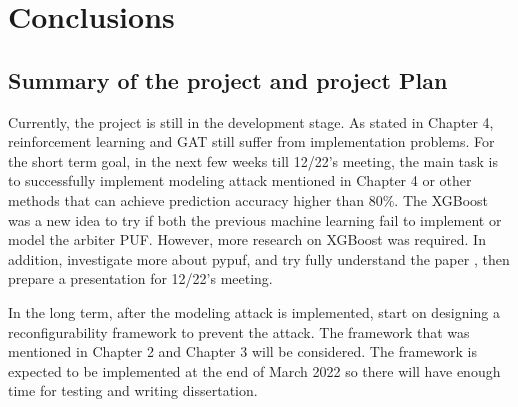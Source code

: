 \chapter{Conclusions}

\section{Summary of the project and project Plan}
Currently, the project is still in the development stage. As stated in Chapter 4, reinforcement learning and GAT still suffer from implementation problems. For the short term goal, in the next few weeks till 12/22's meeting,
the main task is to successfully implement modeling attack mentioned in Chapter 4 or other methods that can achieve prediction accuracy higher than 80\%. The XGBoost was a new idea to try if both the previous machine learning fail to implement or model the arbiter PUF. 
However, more research on XGBoost was required. In addition, investigate more about pypuf, and try fully understand the paper \cite{Reference11}, then prepare a presentation for 12/22's meeting.


In the long term, after the modeling attack is implemented, start on designing a reconfigurability framework to prevent the attack. The framework that was mentioned in Chapter 2 and Chapter 3 will be considered. The framework
is expected to be implemented at the end of March 2022 so there will have enough time for testing and writing dissertation.
